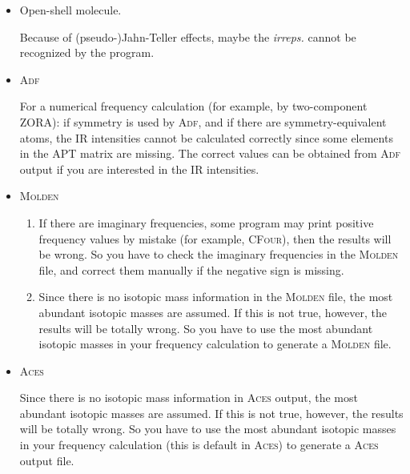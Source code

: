 \documentclass[12pt,english]{extarticle}
\begin{document}
\begin{itemize}
\item Open-shell molecule.

Because of (pseudo-)Jahn-Teller effects, maybe the \textit{irreps.} cannot be recognized by the program.

\item \textsc{Adf}

For a numerical frequency calculation (for example, by two-component ZORA): if symmetry is used by \textsc{Adf}, and if
there are symmetry-equivalent atoms, the IR intensities cannot be calculated correctly since some elements in the APT matrix are
missing. The correct values can be obtained from \textsc{Adf} output if you are interested in the IR intensities.

\item \textsc{Molden}

\begin{enumerate}
\item If there are imaginary frequencies, some program may print positive frequency values
by mistake (for example, \textsc{CFour}), then the results will be wrong. So you have to
check the imaginary frequencies in the \textsc{Molden} file, and correct them manually
if the negative sign is missing.

\item Since there is no isotopic mass information in the \textsc{Molden} file, the most
abundant isotopic masses are assumed. If this is not true, however, the results
will be totally wrong. So you have to use the most abundant isotopic masses
in your frequency calculation to generate a \textsc{Molden} file.
\end{enumerate}

\item \textsc{Aces}

Since there is no isotopic mass information in \textsc{Aces} output, the most
abundant isotopic masses are assumed. If this is not true, however, the results
will be totally wrong. So you have to use the most abundant isotopic masses
in your frequency calculation (this is default in \textsc{Aces}) to generate a \textsc{Aces} output file.

\end{itemize}
\end{document}
